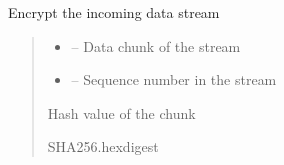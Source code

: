 \documentclass[letterpaper,10pt,english]{sphinxmanual}
\begin{document}
\begin{savenotes}
\begin{fulllineitems}
\begin{savenotes}
\begin{fulllineitems}
\end{fulllineitems}\end{savenotes}


\begin{savenotes}\begin{fulllineitems}
\label{\detokenize{eezz:eezz.filesrv.TEezzFile.encrypt}}
\pysigstartsignatures
{}
\pysigstopsignatures
\sphinxAtStartPar
Encrypt the incoming data stream
\begin{quote}\begin{description}
\begin{itemize}
\item {} 
\sphinxAtStartPar
{} – Data chunk of the stream

\item {} 
\sphinxAtStartPar
{} – Sequence number in the stream

\end{itemize}

\sphinxAtStartPar
Hash value of the chunk

\sphinxAtStartPar
SHA256.hexdigest

\end{description}\end{quote}

\end{fulllineitems}\end{savenotes}



\end{fulllineitems}
\end{savenotes}
\end{document}
